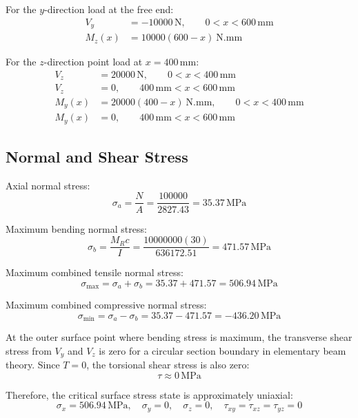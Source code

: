 \documentclass[12pt,a4paper]{article}
\newcommand{\SI}[2]{#1\,\ensuremath{\mathrm{#2}}}
\newcommand{\si}[1]{\ensuremath{\mathrm{#1}}}
\begin{document}
For the \(y\)-direction load at the free end:
\begin{align}
V_y &= \SI{-10000}{N}, \qquad 0<x<\SI{600}{mm} \\
M_z(x) &= 10000(600-x)\ \si{N.mm}
\end{align}

For the \(z\)-direction point load at \(x=\SI{400}{mm}\):
\begin{align}
V_z &= \SI{20000}{N}, \qquad 0<x<\SI{400}{mm} \\
V_z &= 0, \qquad \SI{400}{mm}<x<\SI{600}{mm} \\
M_y(x) &= 20000(400-x)\ \si{N.mm}, \qquad 0<x<\SI{400}{mm} \\
M_y(x) &= 0, \qquad \SI{400}{mm}<x<\SI{600}{mm}
\end{align}

\subsection{Normal and Shear Stress}

Axial normal stress:
\begin{equation}
\sigma_a = \frac{N}{A} = \frac{100000}{2827.43} = \SI{35.37}{MPa}
\end{equation}

Maximum bending normal stress:
\begin{equation}
\sigma_b = \frac{M_R c}{I} = \frac{10000000(30)}{636172.51} = \SI{471.57}{MPa}
\end{equation}

Maximum combined tensile normal stress:
\begin{equation}
\sigma_{\max} = \sigma_a+\sigma_b = 35.37+471.57 = \SI{506.94}{MPa}
\end{equation}

Maximum combined compressive normal stress:
\begin{equation}
\sigma_{\min} = \sigma_a-\sigma_b = 35.37-471.57 = \SI{-436.20}{MPa}
\end{equation}

At the outer surface point where bending stress is maximum, the transverse shear stress from \(V_y\) and \(V_z\) is zero for a circular section boundary in elementary beam theory. Since \(T=0\), the torsional shear stress is also zero:
\begin{equation}
\tau \approx \SI{0}{MPa}
\end{equation}

Therefore, the critical surface stress state is approximately uniaxial:
\begin{equation}
\sigma_x=\SI{506.94}{MPa}, \quad
\sigma_y=0, \quad
\sigma_z=0, \quad
\tau_{xy}=\tau_{xz}=\tau_{yz}=0
\end{equation}
\end{document}
